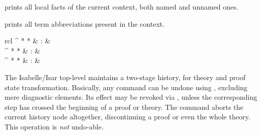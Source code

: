 \begin{isabellebody}
\begin{isamarkuptext}
\begin{descr}
  \item [\hyperlink{command.print-facts}{\mbox{\isa{\isacommand{print{\isacharunderscore}facts}}}}] prints all local facts of the
  current context, both named and unnamed ones.
  
  \item [\hyperlink{command.print-binds}{\mbox{\isa{\isacommand{print{\isacharunderscore}binds}}}}] prints all term abbreviations
  present in the context.

  \end{descr}%
\end{isamarkuptext}%
\isamarkuptrue%
%
\isamarkuptrue%
%
\begin{isamarkuptext}%
\begin{matharray}{rcl}
    \hypertarget{command.undo}{\hyperlink{command.undo}{\mbox{}}}^{{ * }{ * }} & : & \isarkeep{\cdot} \\
    \hypertarget{command.redo}{\hyperlink{command.redo}{\mbox{}}}^{{ * }{ * }} & : & \isarkeep{\cdot} \\
    \hypertarget{command.kill}{\hyperlink{command.kill}{\mbox{}}}^{{ * }{ * }} & : & \isarkeep{\cdot} \\
  \end{matharray}

  The Isabelle/Isar top-level maintains a two-stage history, for
  theory and proof state transformation.  Basically, any command can
  be undone using \hyperlink{command.undo}{\mbox{}}, excluding mere diagnostic
  elements.  Its effect may be revoked via \hyperlink{command.redo}{\mbox{}}, unless
  the corresponding \hyperlink{command.undo}{\mbox{}} step has crossed the beginning
  of a proof or theory.  The \hyperlink{command.kill}{\mbox{}} command aborts the
  current history node altogether, discontinuing a proof or even the
  whole theory.  This operation is \emph{not} undo-able.


\end{isamarkuptext}
\end{isabellebody}
